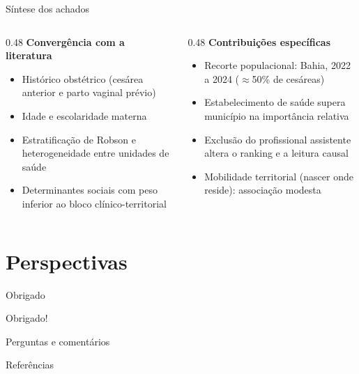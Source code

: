 \documentclass[aspectratio=169,xcolor=table]{beamer}
\begin{document}
\begin{frame}{Síntese dos achados}
    \begin{columns}[T]
        \begin{column}{0.48\textwidth}
            \textbf{Convergência com a literatura}
            \begin{itemize}
                \item Histórico obstétrico (cesárea anterior e parto vaginal prévio)
                \item Idade e escolaridade materna
                \item Estratificação de Robson e heterogeneidade entre unidades de saúde
                \item Determinantes sociais com peso inferior ao bloco clínico-territorial
            \end{itemize}
        \end{column}
        \begin{column}{0.48\textwidth}
            \textbf{Contribuições específicas}
            \begin{itemize}
                \item Recorte populacional: Bahia, 2022 a 2024 ($\approx$50\% de cesáreas)
                \item Estabelecimento de saúde supera município na importância relativa
                \item Exclusão do profissional assistente altera o ranking e a leitura causal
                \item Mobilidade territorial (nascer onde reside): associação modesta
            \end{itemize}
        \end{column}
    \end{columns}

    \vspace{0.4em}
\end{frame}

\section{Perspectivas}

\begin{frame}{Obrigado}
    \begin{center}
        \Huge Obrigado!

        \vspace{0.8em}
        \large Perguntas e comentários
    \end{center}
\end{frame}

\begin{frame}{Referências}
    \footnotesize
    
    
\end{frame}
\end{document}

